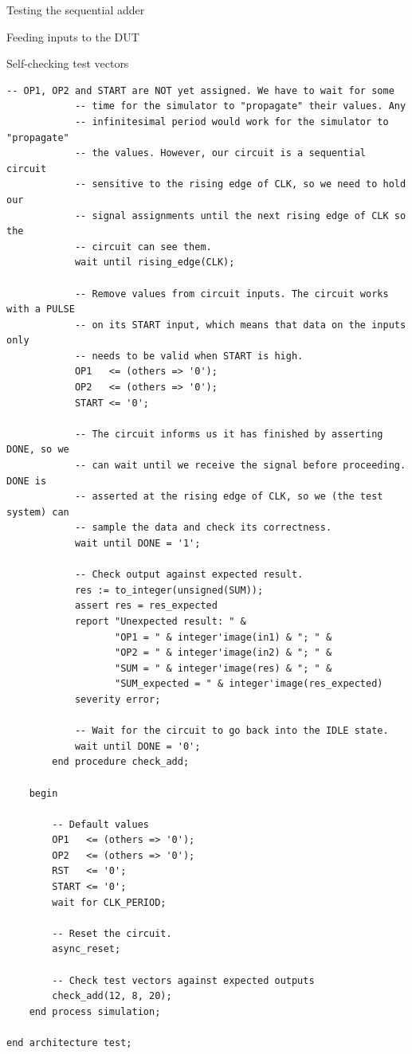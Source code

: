\documentclass[lab]{course}
\begin{document}
\begin{section}{Testing the sequential adder}
\begin{subsection}{Feeding inputs to the DUT}
\begin{subsubsection}{Self-checking test vectors}
\begin{lstlisting}[caption={Add test vectors}, captionpos=b, label={lst:sequential_process_simulation_test_vectors}]
            -- OP1, OP2 and START are NOT yet assigned. We have to wait for some
            -- time for the simulator to "propagate" their values. Any
            -- infinitesimal period would work for the simulator to "propagate"
            -- the values. However, our circuit is a sequential circuit
            -- sensitive to the rising edge of CLK, so we need to hold our
            -- signal assignments until the next rising edge of CLK so the
            -- circuit can see them.
            wait until rising_edge(CLK);

            -- Remove values from circuit inputs. The circuit works with a PULSE
            -- on its START input, which means that data on the inputs only
            -- needs to be valid when START is high.
            OP1   <= (others => '0');
            OP2   <= (others => '0');
            START <= '0';

            -- The circuit informs us it has finished by asserting DONE, so we
            -- can wait until we receive the signal before proceeding. DONE is
            -- asserted at the rising edge of CLK, so we (the test system) can
            -- sample the data and check its correctness.
            wait until DONE = '1';

            -- Check output against expected result.
            res := to_integer(unsigned(SUM));
            assert res = res_expected
            report "Unexpected result: " &
                   "OP1 = " & integer'image(in1) & "; " &
                   "OP2 = " & integer'image(in2) & "; " &
                   "SUM = " & integer'image(res) & "; " &
                   "SUM_expected = " & integer'image(res_expected)
            severity error;

            -- Wait for the circuit to go back into the IDLE state.
            wait until DONE = '0';
        end procedure check_add;

    begin

        -- Default values
        OP1   <= (others => '0');
        OP2   <= (others => '0');
        RST   <= '0';
        START <= '0';
        wait for CLK_PERIOD;

        -- Reset the circuit.
        async_reset;

        -- Check test vectors against expected outputs
        check_add(12, 8, 20);
    end process simulation;

end architecture test;
            \end{lstlisting}


\end{subsubsection}
\end{subsection}
\end{section}
\end{document}
